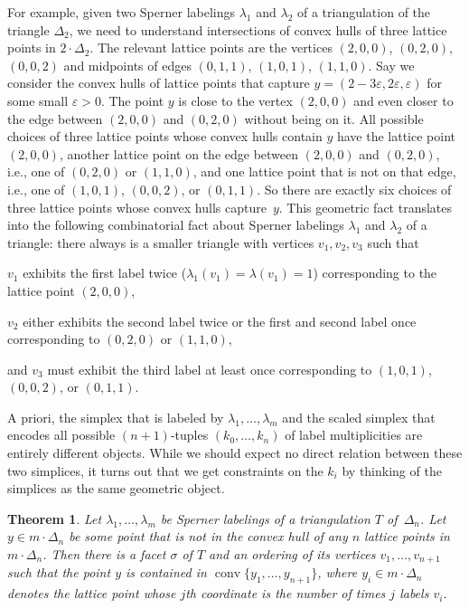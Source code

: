 \documentclass[a4paper,10pt,reqno, english]{amsart}
\theoremstyle{plain}
\newtheorem{thm}{Theorem}
\theoremstyle{definition}
\DeclareMathOperator{\conv}{conv}
\begin{document}
For example, given two Sperner labelings $\lambda_1$ and $\lambda_2$ of a triangulation of the triangle $\Delta_2$,
we need to understand intersections of convex hulls of three lattice points in $2\cdot \Delta_2$. The relevant lattice
points are the vertices $(2,0,0)$, $(0,2,0)$, $(0,0,2)$ and midpoints of edges $(0,1,1)$, $(1,0,1)$, $(1,1,0)$.
Say we consider the convex hulls of lattice points that capture $y = (2-3\varepsilon, 2\varepsilon, \varepsilon)$ for
some small $\varepsilon > 0$. The point $y$ is close to the vertex $(2,0,0)$ and even closer to the edge between
$(2,0,0)$ and $(0,2,0)$ without being on it. All possible choices of three lattice points whose convex hulls contain $y$
have the lattice point $(2,0,0)$, another lattice point on the edge between
$(2,0,0)$ and $(0,2,0)$, i.e., one of $(0,2,0)$ or $(1,1,0)$, and one lattice point that is not on that edge, i.e., one of $(1,0,1)$, $(0,0,2)$, or $(0,1,1)$.
So there are exactly six choices of three lattice points whose convex hulls capture~$y$. This geometric fact translates
into the following combinatorial fact about Sperner labelings $\lambda_1$ and $\lambda_2$ of a triangle: there always
is a smaller triangle with vertices $v_1, v_2, v_3$ such that
\begin{compactitem}
	\item $v_1$ exhibits the first label twice ($\lambda_1(v_1) = \lambda(v_1) = 1$) corresponding to the lattice point $(2,0,0)$,
	\item $v_2$ either exhibits the second label twice or the first and second label once corresponding to $(0,2,0)$ or $(1,1,0)$,
	\item and $v_3$ must exhibit the third label at least once corresponding to $(1,0,1)$, $(0,0,2)$, or $(0,1,1)$.
\end{compactitem}


A priori, the simplex that is labeled by $\lambda_1, \dots, \lambda_m$ and the scaled simplex that encodes all possible $(n+1)$-tuples
$(k_0, \dots, k_n)$ of label multiplicities are entirely different objects. While we should expect no direct relation between these two simplices, 
it turns out that we get constraints on the $k_i$ by thinking of the simplices as the same geometric object.

\begin{thm}
Let $\lambda_1, \dots, \lambda_m$ be Sperner labelings of a triangulation $T$ of~$\Delta_n$. Let $y \in m \cdot \Delta_n$ be some point that is not in the convex hull of any $n$ lattice points in~$m\cdot \Delta_n$. Then there is a facet $\sigma$ of $T$ and an ordering of its vertices $v_1, \dots, v_{n+1}$ such that the point $y$ is contained in $\conv\{y_1, \dots, y_{n+1}\}$, where 
$y_i \in m \cdot \Delta_n$ denotes the lattice point whose $j$th coordinate is the number of times $j$ labels $v_i$.
\end{thm}
\end{document}
